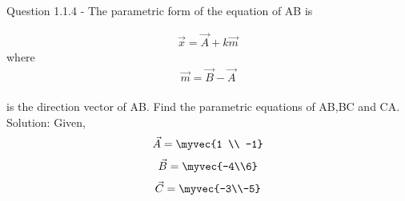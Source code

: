\documentclass[journal,12pt,twocolumn]{IEEEtran}
\begin{document}
Question 1.1.4 - The parametric form of the equation of AB is 

\begin{align}
\vec{x} = \vec{A} + k\vec{m} 
\end{align}
where 
\begin{align}
\vec{m} =\vec{B} - \vec{A}
\end{align}\\
is the direction vector of AB. Find the parametric equations of AB,BC    and CA.\\

Solution:  Given, 
\begin{align}
\vec{A}  =
    \myvec{1 \\ -1}   
    \end{align}
\begin{align}
\vec{ B }= 
     \myvec{-4\\6}
\end{align}
\begin{align}
\vec{C} = 
     \myvec{-3\\-5}
     \end{align}
\end{document}
